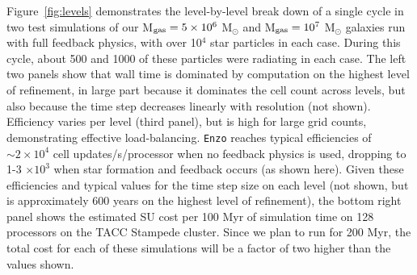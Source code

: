 \documentclass[11pt]{article}
\begin{document}
Figure~\ref{fig:levels} demonstrates the level-by-level break down of a single cycle in two test simulations of our M$_{\rm gas} = 5 \times 10^{6}$ M$_{\odot}$ and M$_{\rm gas} = 10^{7}$ M$_{\odot}$ galaxies run with full feedback physics, with over 10$^4$ star particles in each case. During this cycle, about 500 and 1000 of these particles were radiating in each case. The left two panels show that wall time is dominated by computation on the highest level of refinement, in large part because it dominates the cell count across levels, but also because the time step decreases linearly with resolution (not shown). Efficiency varies per level (third panel), but is high for large grid counts, demonstrating effective load-balancing. \texttt{Enzo} reaches typical efficiencies of $\sim 2 \times 10^{4}$ cell updates/s/processor when no feedback physics is used, dropping to 1-3 $\times 10^3$ when star formation and feedback occurs (as shown here). Given these efficiencies and typical values for the time step size on each level (not shown, but is approximately 600 years on the highest level of refinement), the bottom right panel shows the estimated SU cost per 100 Myr of simulation time on 128 processors on the TACC Stampede cluster. Since we plan to run for 200 Myr, the total cost for each of these simulations will be a factor of two higher than the values shown.

\end{document}
